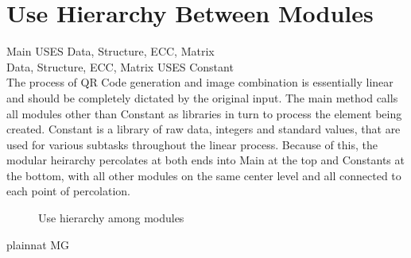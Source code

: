 \documentclass[12pt, titlepage]{article}
\begin{document}
\section{Use Hierarchy Between Modules} \label{SecUse}

Main USES Data, Structure, ECC, Matrix\\
Data, Structure, ECC, Matrix USES Constant\\

The process of QR Code generation and image combination is essentially linear 
and should be completely dictated by the original input. The main method calls 
all modules other than Constant as libraries in turn to process the element being
created. Constant is a library of raw data, integers and standard values, that 
are used for various subtasks throughout the linear process. Because of this, the 
modular heirarchy percolates at both ends into Main at the top and Constants at 
the bottom, with all other modules on the same center level and all connected 
to each point of percolation.

\begin{figure}[H]
\centering
\caption{Use hierarchy among modules}
\label{FigUH}
\end{figure}


 {plainnat}
 {MG}
\end{document}
